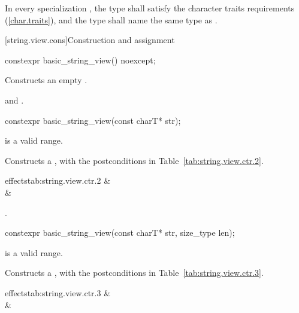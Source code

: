 \pnum
In every specialization , the type  shall satisfy the character traits requirements (\ref{char.traits}),
and the type  shall name the same type as .

[string.view.cons]{Construction and assignment}

%
\begin{itemdecl}
constexpr basic_string_view() noexcept;
\end{itemdecl}

\begin{itemdescr}
\pnum
\effects
Constructs an empty .

\pnum
\postconditions
{} and .
\end{itemdescr}

%
\begin{itemdecl}
constexpr basic_string_view(const charT* str);
\end{itemdecl}

\begin{itemdescr}
\pnum
\requires
{} is a valid range.

\pnum
\effects
Constructs a , with the postconditions
in Table~\ref{tab:string.view.ctr.2}.
\begin{libefftabvaluenarrow}{ effects}{tab:string.view.ctr.2}
 &  \\
 &  \\
\end{libefftabvaluenarrow}

\pnum
\complexity
{}.
\end{itemdescr}

%
\begin{itemdecl}
constexpr basic_string_view(const charT* str, size_type len);
\end{itemdecl}

\begin{itemdescr}
\pnum
\requires
{} is a valid range.

\pnum
\effects
Constructs a , with the postconditions in Table~\ref{tab:string.view.ctr.3}.
\begin{libefftabvaluenarrow}{ effects}{tab:string.view.ctr.3}
 &  \\
 &  \\
\end{libefftabvaluenarrow}
\end{itemdescr}

